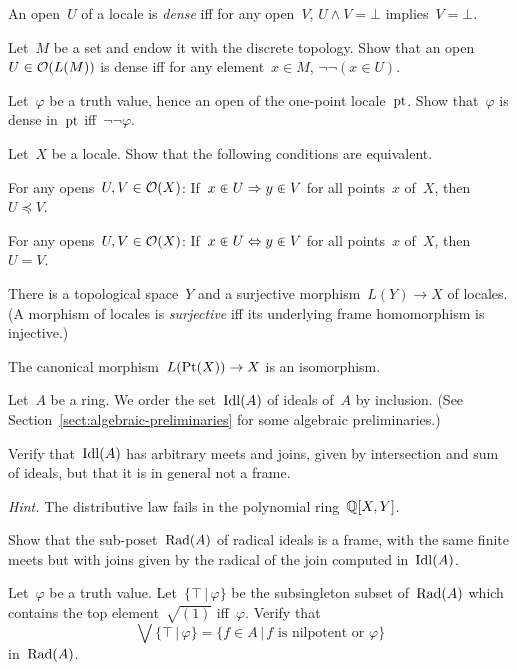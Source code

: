 \documentclass{ws-rv9x6}
\begin{document}
{\begin{exercise}%
\label{ex:dense-opens}%
An open~$U$ of a locale is \emph{dense} iff for any open~$V$, $U \wedge V =
\bot$ implies~$V = \bot$.
\begin{alphlist}[(b)]
\item Let~$M$ be a set and endow it with the discrete topology. Show that an
open~$U \in \mathcal{O}(L(M))$ is dense iff for any element~$x \in M$, $\neg\neg(x \in
U)$.
\item Let~$\varphi$ be a truth value, hence an open of the one-point
locale~$\mathrm{pt}$. Show that~$\varphi$ is dense in~$\mathrm{pt}$ iff~$\neg\neg\varphi$.
\end{alphlist}
\end{exercise}

\begin{exercise}%
Let~$X$ be a locale. Show that the following conditions are equivalent.
\begin{alphlist}[(c)]
\item For any opens~$U, V \in \mathcal{O}(X)$: If~$x \inplus U \Rightarrow y \inplus V$
for all points~$x$ of~$X$, then~$U \preceq V$.
\item For any opens~$U, V \in \mathcal{O}(X)$: If~$x \inplus U \Leftrightarrow y \inplus V$
for all points~$x$ of~$X$, then~$U = V$.
\item There is a topological space~$Y$ and a surjective morphism~$L(Y) \to X$
of locales. (A morphism of locales is \emph{surjective} iff its underlying
frame homomorphism is injective.)
\item The canonical morphism~$L(\mathrm{Pt}(X)) \to X$ is an isomorphism.
\end{alphlist}
\end{exercise}

\begin{exercise}%
\label{ex:frame-of-radical-ideals}%
Let~$A$ be a ring. We order the set~$\mathrm{Idl}(A)$ of ideals of~$A$ by inclusion.
(See Section~\ref{sect:algebraic-preliminaries} for some algebraic
preliminaries.)
\begin{alphlist}[(b)]
\item Verify that~$\mathrm{Idl}(A)$ has arbitrary meets and joins, given by
intersection and sum of ideals, but that it is in general not a
frame.\smallskip

{\scriptsize\emph{Hint.} The distributive law fails in the polynomial ring~$\mathbb{Q}[X,Y]$.\par}
\item Show that the sub-poset~$\mathrm{Rad}(A)$ of radical ideals is a frame, with
the same finite meets but with joins given by the radical of the join computed
in~$\mathrm{Idl}(A)$.
\item\label{item:join-top} Let~$\varphi$ be a truth value. Let~$\{\top\,|\,\varphi\}$ be the
subsingleton subset of~$\mathrm{Rad}(A)$ which contains the top element~$\sqrt{(1)}$
iff~$\varphi$. Verify that
\[ \bigvee\{\top\,|\,\varphi\} = \{ f \in A \,|\, \text{$f$ is nilpotent
or~$\varphi$} \} \]
in~$\mathrm{Rad}(A)$.
\end{alphlist}
\end{exercise}

}
\end{document}
